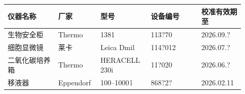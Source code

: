\documentclass[UTF8,10pt,a4paper,fontset=fandol]{ctexart}
\newcommand{\fieldvalue}[1]{#1}
\newcommand{\handwritten}[1]{#1}
\begin{document}
\begin{center}
\small
\begin{tabular}{|p{0.20\linewidth}|p{0.15\linewidth}|p{0.20\linewidth}|p{0.20\linewidth}|p{0.17\linewidth}|}
\hline
仪器名称 & 厂家 & 型号 & 设备编号 & 校准有效期至\\
\hline
生物安全柜 &
\fieldvalue{Thermo} &
\fieldvalue{\handwritten{1381}} &
\fieldvalue{\handwritten{113?70}} &
\fieldvalue{\handwritten{2026.09.?}}\\
\hline
细胞显微镜 &
\fieldvalue{莱卡} &
\fieldvalue{Leica Dmil} &
\fieldvalue{\handwritten{114?012}} &
\fieldvalue{\handwritten{2026.07.?}}\\
\hline
二氧化碳培养箱 &
\fieldvalue{Thermo} &
\fieldvalue{HERACELL 230i} &
\fieldvalue{\handwritten{11?020}} &
\fieldvalue{\handwritten{2026.06.?}}\\
\hline
移液器 &
\fieldvalue{Eppendorf} &
\fieldvalue{\handwritten{100--1000\,\textmu l}} &
\fieldvalue{\handwritten{868?2?}} &
\fieldvalue{\handwritten{2026.02.11}}\\
\hline
\end{tabular}
\end{center}
\end{document}
